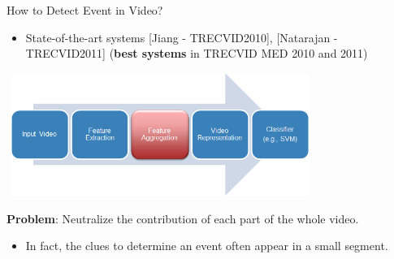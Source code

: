 \documentclass{beamer}
\begin{document}




\begin{frame}[t]{How to Detect Event in Video?}
	\begin{itemize}
		\item State-of-the-art systems [Jiang - TRECVID2010], [Natarajan - TRECVID2011] (\textbf{best systems} in TRECVID MED 2010 and 2011)
	\end{itemize}
	
	\begin{center}
		\includegraphics[width=10cm,height=4cm]{images/part3/standardapproach.png}
	\end{center}
	
		\textbf{Problem}: Neutralize the contribution of each part of the whole video. 
		\begin{itemize}
			\item In fact, the clues to determine an event often appear in a small segment.
		\end{itemize}
		
\end{frame}
\end{document}

